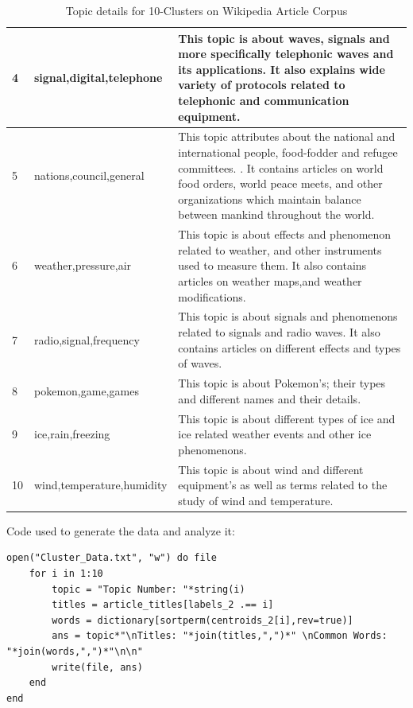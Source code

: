\documentclass{article}
\begin{document}
\begin{enumerate}[label=(\alph*)]
\begin{table}[ht]
\begin{tabular}{p{0.7cm}p{5cm}p{9cm}}
    \hline
    4 & signal,digital,telephone & This topic is about waves, signals and more specifically telephonic waves and its applications. It also explains wide variety of protocols related to telephonic and communication equipment.\\
    \hline
    5 & nations,council,general & This topic attributes about the national and international people, food-fodder and refugee committees. . It contains articles on world food orders, world peace meets, and other organizations which maintain balance between mankind throughout the world.\\
    \hline
    6 & weather,pressure,air & This topic is about effects and phenomenon related to weather, and other instruments used to measure them. It also contains articles on weather maps,and weather modifications.\\
    \hline
    7 & radio,signal,frequency & This topic is about signals and phenomenons related to signals and radio waves. It also contains articles on different effects and types of waves.\\
    \hline
    8 & pokemon,game,games & This topic is about Pokemon's; their types and different names and their details.\\
    \hline
    9 & ice,rain,freezing & This topic is about different types of ice and ice related weather events and other ice phenomenons.\\
    \hline
    10 & wind,temperature,humidity & This topic is about wind and different equipment's as well as terms related to the study of wind and temperature. \\
    \hline
    \end{tabular}
    \caption{Topic details for 10-Clusters on Wikipedia Article Corpus}
    \label{tab:my_label}
\end{table}
Code used to generate the data and analyze it:
\begin{verbatim}
open("Cluster_Data.txt", "w") do file
    for i in 1:10
        topic = "Topic Number: "*string(i)
        titles = article_titles[labels_2 .== i]
        words = dictionary[sortperm(centroids_2[i],rev=true)]
        ans = topic*"\nTitles: "*join(titles,",")*" \nCommon Words: "*join(words,",")*"\n\n"
        write(file, ans)
    end
end
\end{verbatim}
\end{enumerate}
\end{document}
